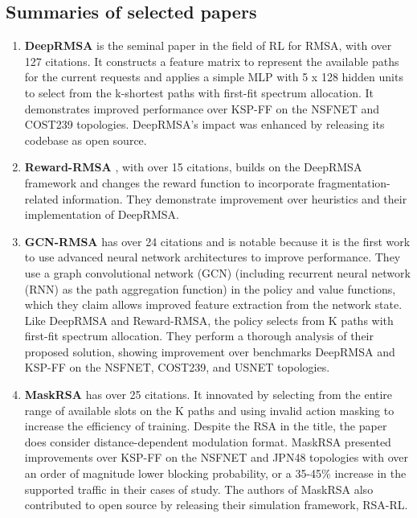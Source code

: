 \subsection{Summaries of selected papers}
\label{sec:paper_summaries}


\begin{enumerate}
    \item \textbf{DeepRMSA} \cite{chen_deeprmsa_2019} is the seminal paper in the field of RL for RMSA, with over 127 citations. It constructs a feature matrix to represent the available paths for the current requests and applies a simple MLP with 5 x 128 hidden units to select from the k-shortest paths with first-fit spectrum allocation. It demonstrates improved performance over KSP-FF on the NSFNET and COST239 topologies. DeepRMSA's impact was enhanced by releasing its codebase as open source.
    \item \textbf{Reward-RMSA} \cite{tang_heuristic_2022}, with over 15 citations, builds on the DeepRMSA framework and changes the reward function to incorporate fragmentation-related information. They demonstrate improvement over heuristics and their implementation of DeepRMSA.
    \item \textbf{GCN-RMSA} \cite{xu_deep_2022} has over 24 citations and is notable because it is the first work to use advanced neural network architectures to improve performance. They use a graph convolutional network (GCN) (including recurrent neural network (RNN) as the path aggregation function) in the policy and value functions, which they claim allows improved feature extraction from the network state. Like DeepRMSA and Reward-RMSA, the policy selects from K paths with first-fit spectrum allocation. They perform a thorough analysis of their proposed solution, showing improvement over benchmarks DeepRMSA and KSP-FF on the NSFNET, COST239, and USNET topologies. 
    \item \textbf{MaskRSA} \cite{shimoda_mask_2021} has over 25 citations. It innovated by selecting from the entire range of available slots on the K paths and using invalid action masking \cite{huang_closer_2020} to increase the efficiency of training. Despite the RSA in the title, the paper does consider distance-dependent modulation format. MaskRSA presented improvements over KSP-FF on the NSFNET and JPN48 topologies with over an order of magnitude lower blocking probability, or a 35-45\% increase in the supported traffic in their cases of study. The authors of MaskRSA also contributed to open source by releasing their simulation framework, RSA-RL.

\end{enumerate}
